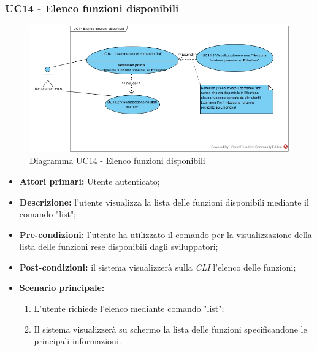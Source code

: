 \subsubsection{UC14 - Elenco funzioni disponibili}
\begin{figure}[h]
	\centering
	\includegraphics[width=\linewidth]{res/img/UC14.jpg}
	\caption{Diagramma UC14 - Elenco funzioni disponibili}
\end{figure}
\begin{itemize}
	\item \textbf{Attori primari:} Utente autenticato;
	\item \textbf{Descrizione:} l'utente visualizza la lista delle funzioni disponibili mediante il comando "list"; 
	\item \textbf{Pre-condizioni:} l'utente ha utilizzato il comando per la visualizzazione della lista delle funzioni rese disponibili dagli sviluppatori;
	\item \textbf{Post-condizioni:} il sistema visualizzerà sulla \textit{CLI\glo} l'elenco delle funzioni;
	\item \textbf{Scenario principale:} 
	\begin{enumerate}
		\item L'utente richiede l'elenco mediante comando "list";
		\item Il sistema visualizzerà su schermo la lista delle funzioni specificandone le principali informazioni.
	\end{enumerate}
\end{itemize}